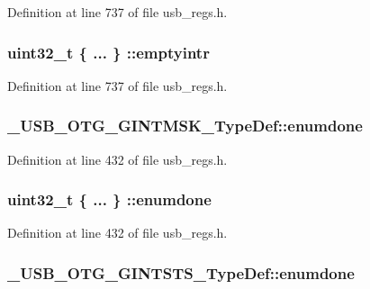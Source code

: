 Definition at line 737 of file usb\-\_\-regs.\-h.

\hypertarget{group___u_s_b___o_t_g___d_r_i_v_e_r_ga7202d8da5b424fea121da300b124fd7a}{
\subsubsection[{emptyintr}]{\setlength{\rightskip}{0pt plus 5cm}uint32\-\_\-t \{ ... \} \-::emptyintr}}\label{group___u_s_b___o_t_g___d_r_i_v_e_r_ga7202d8da5b424fea121da300b124fd7a}


Definition at line 737 of file usb\-\_\-regs.\-h.

\hypertarget{group___u_s_b___o_t_g___d_r_i_v_e_r_ga975455f064183c733669c1d1d8135226}{
\subsubsection[{enumdone}]{ \-\_\-\-U\-S\-B\-\_\-\-O\-T\-G\-\_\-\-G\-I\-N\-T\-M\-S\-K\-\_\-\-Type\-Def\-::enumdone}}\label{group___u_s_b___o_t_g___d_r_i_v_e_r_ga975455f064183c733669c1d1d8135226}


Definition at line 432 of file usb\-\_\-regs.\-h.

\hypertarget{group___u_s_b___o_t_g___d_r_i_v_e_r_ga33e8e41f132676e82af16c81fa0e4014}{
\subsubsection[{enumdone}]{\setlength{\rightskip}{0pt plus 5cm}uint32\-\_\-t \{ ... \} \-::enumdone}}\label{group___u_s_b___o_t_g___d_r_i_v_e_r_ga33e8e41f132676e82af16c81fa0e4014}


Definition at line 432 of file usb\-\_\-regs.\-h.

\hypertarget{group___u_s_b___o_t_g___d_r_i_v_e_r_gaab39d5018e7840be12a735b020a24c39}{
\subsubsection[{enumdone}]{ \-\_\-\-U\-S\-B\-\_\-\-O\-T\-G\-\_\-\-G\-I\-N\-T\-S\-T\-S\-\_\-\-Type\-Def\-::enumdone}}\label{group___u_s_b___o_t_g___d_r_i_v_e_r_gaab39d5018e7840be12a735b020a24c39}



